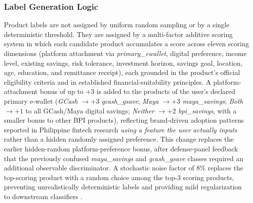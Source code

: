 \documentclass{icsthesis}
\begin{document}
\begin{mainmatter}
				\subsubsection{Label Generation Logic}
					\label{sec:label-gen}
					Product labels are not assigned by uniform random sampling or by a single deterministic threshold. They are assigned by a multi-factor additive scoring system in which each candidate product accumulates a score across eleven scoring dimensions (platform attachment via \emph{primary\_ewallet}, digital preference, income level, existing savings, risk tolerance, investment horizon, savings goal, location, age, education, and remittance receipt), each grounded in the product's official eligibility criteria and in established financial-suitability principles. A platform-attachment bonus of up to $+3$ is added to the products of the user's declared primary e-wallet (\emph{GCash} $\to+3$ \emph{gcash\_gsave}; \emph{Maya} $\to+3$ \emph{maya\_savings}; \emph{Both} $\to+1$ to all GCash/Maya digital savings; \emph{Neither} $\to+2$ \emph{bpi\_savings}, with a smaller bonus to other BPI products), reflecting brand-driven adoption patterns reported in Philippine fintech research \cite{ref9} \emph{using a feature the user actually inputs} rather than a hidden randomly assigned preference. This change replaces the earlier hidden-random platform-preference bonus, after defense-panel feedback that the previously confused \emph{maya\_savings} and \emph{gcash\_gsave} classes required an additional observable discriminator. A stochastic noise factor of 8\% replaces the top-scoring product with a random choice among the top-3 scoring products, preventing unrealistically deterministic labels and providing mild regularization to downstream classifiers \cite{ref46}.


\end{mainmatter}
\end{document}
